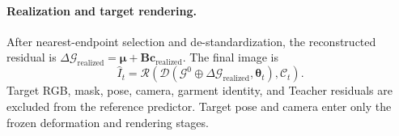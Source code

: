 \paragraph{Realization and target rendering.}
After nearest-endpoint selection and de-standardization, the reconstructed residual is $\Delta\mathcal G_{\mathrm{realized}}=\boldsymbol\mu+\mathbf B\mathbf c_{\mathrm{realized}}$. The final image is
\begin{equation}
\widehat I_t=\mathcal R\!\left(\mathcal D(\mathcal G^0\oplus\Delta\mathcal G_{\mathrm{realized}},\boldsymbol\theta_t),\mathcal C_t\right).
\end{equation}
Target RGB, mask, pose, camera, garment identity, and Teacher residuals are excluded from the reference predictor. Target pose and camera enter only the frozen deformation and rendering stages.

